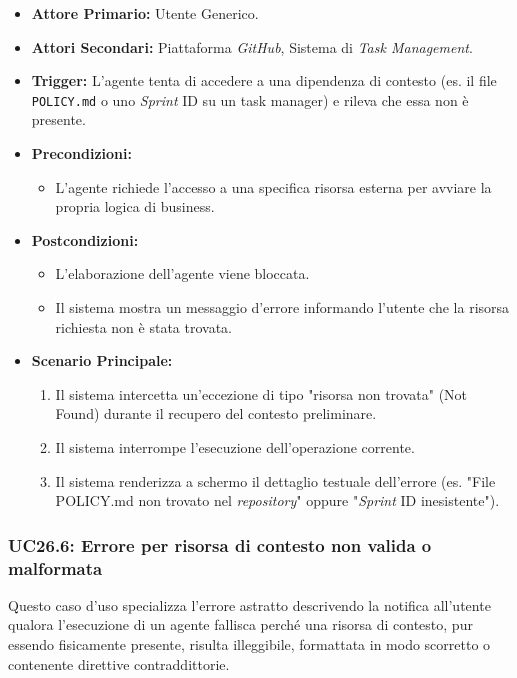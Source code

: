 \documentclass[12pt, a4paper]{article}
\begin{document}
\begin{itemize}
    \item \textbf{Attore Primario:} Utente Generico.
    \item \textbf{Attori Secondari:} Piattaforma \textit{GitHub}, Sistema di \textit{Task Management}.
    \item \textbf{Trigger:} L'agente tenta di accedere a una dipendenza di contesto (es. il file \texttt{POLICY.md} o uno \textit{Sprint} ID su un task manager) e rileva che essa non è presente.
    \item \textbf{Precondizioni:}
    \begin{itemize}
        \item L'agente richiede l'accesso a una specifica risorsa esterna per avviare la propria logica di business.
    \end{itemize}
    \item \textbf{Postcondizioni:}
    \begin{itemize}
        \item L'elaborazione dell'agente viene bloccata.
        \item Il sistema mostra un messaggio d'errore informando l'utente che la risorsa richiesta non è stata trovata.
    \end{itemize}
    \item \textbf{Scenario Principale:}
    \begin{enumerate}
        \item Il sistema intercetta un'eccezione di tipo "risorsa non trovata" (Not Found) durante il recupero del contesto preliminare.
        \item Il sistema interrompe l'esecuzione dell'operazione corrente.
        \item Il sistema renderizza a schermo il dettaglio testuale dell'errore (es. "File POLICY.md non trovato nel \textit{repository}" oppure "\textit{Sprint} ID inesistente").
    \end{enumerate}
\end{itemize}

\subsubsection{UC26.6: Errore per risorsa di contesto non valida o malformata}\label{uc:26.6}
Questo caso d'uso specializza l'errore astratto descrivendo la notifica all'utente qualora l'esecuzione di un agente fallisca perché una risorsa di contesto, pur essendo fisicamente presente, risulta illeggibile, formattata in modo scorretto o contenente direttive contraddittorie.
\end{document}
